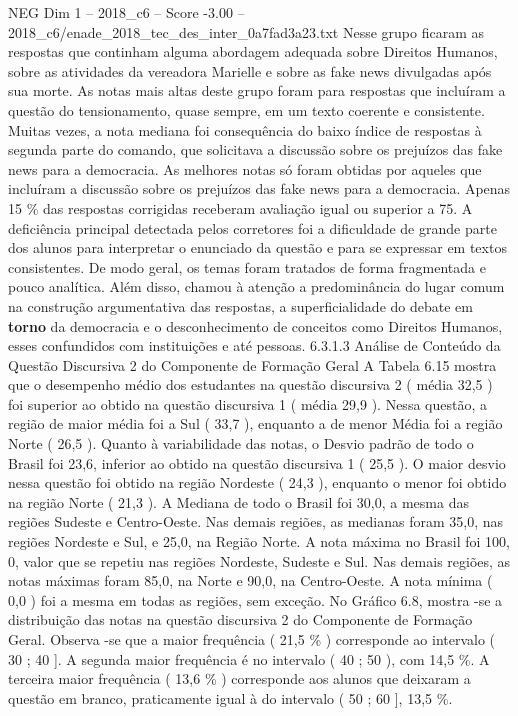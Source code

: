 \begin{textsample}{NEG Dim 1 – 2018\_c6 – Score -3.00 – 2018\_c6/enade\_2018\_tec\_des\_inter\_0a7fad3a23.txt}
Nesse grupo ficaram as respostas que continham alguma abordagem adequada sobre Direitos Humanos, sobre as atividades da vereadora Marielle e sobre as fake news divulgadas após sua morte.
As notas mais altas deste grupo foram para respostas que incluíram a questão do tensionamento, quase sempre, em um texto coerente e consistente.
Muitas vezes, a nota mediana foi consequência do baixo índice de respostas à segunda parte do comando, que solicitava a discussão sobre os prejuízos das fake news para a democracia.
As melhores notas só foram obtidas por aqueles que incluíram a discussão sobre os prejuízos das fake news para a democracia.
Apenas 15 \% das respostas corrigidas receberam avaliação igual ou superior a 75.
A deficiência principal detectada pelos corretores foi a dificuldade de grande parte dos alunos para interpretar o enunciado da questão e para se expressar em textos consistentes.
De modo geral, os temas foram tratados de forma fragmentada e pouco analítica.
Além disso, chamou à atenção a predominância do lugar comum na construção argumentativa das respostas, a superficialidade do debate em \textbf{torno} da democracia e o desconhecimento de conceitos como Direitos Humanos, esses confundidos com instituições e até pessoas. 6.3.1.3 Análise de Conteúdo da Questão Discursiva 2 do Componente de Formação Geral A Tabela 6.15 mostra que o desempenho médio dos estudantes na questão discursiva 2 ( média 32,5 ) foi superior ao obtido na questão discursiva 1 ( média 29,9 ).
Nessa questão, a região de maior média foi a Sul ( 33,7 ), enquanto a de menor Média foi a região Norte ( 26,5 ).
Quanto à variabilidade das notas, o Desvio padrão de todo o Brasil foi 23,6, inferior ao obtido na questão discursiva 1 ( 25,5 ).
O maior desvio nessa questão foi obtido na região Nordeste ( 24,3 ), enquanto o menor foi obtido na região Norte ( 21,3 ).
A Mediana de todo o Brasil foi 30,0, a mesma das regiões Sudeste e Centro-Oeste.
Nas demais regiões, as medianas foram 35,0, nas regiões Nordeste e Sul, e 25,0, na Região Norte.
A nota máxima no Brasil foi 100, 0, valor que se repetiu nas regiões Nordeste, Sudeste e Sul.
Nas demais regiões, as notas máximas foram 85,0, na Norte e 90,0, na Centro-Oeste.
A nota mínima ( 0,0 ) foi a mesma em todas as regiões, sem exceção.
No Gráfico 6.8, mostra -se a distribuição das notas na questão discursiva 2 do Componente de Formação Geral.
Observa -se que a maior frequência ( 21,5 \% ) corresponde ao intervalo ( 30 ; 40 ].
A segunda maior frequência é no intervalo ( 40 ; 50 ), com 14,5 \%.
A terceira maior frequência ( 13,6 \% ) corresponde aos alunos que deixaram a questão em branco, praticamente igual à do intervalo ( 50 ; 60 ], 13,5 \%.

\end{textsample}
